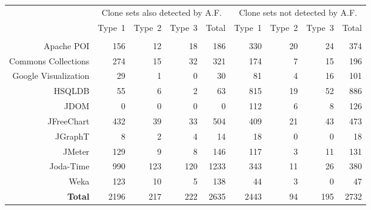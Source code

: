 
   {

\thesis{\begin{adjustwidth}{-35pt}{}}
\paper{\begin{adjustwidth}{-35pt}{}}

      \begin{tabular}{r@{\quad}
         rrrr|
         rrrr
      }

         & \multicolumn{4}{c|}{Clone sets also detected by A.F.}
         & \multicolumn{4}{c}{Clone sets not detected by A.F.}
         \\
         & Type~1 & Type~2 & Type~3 & Total
         & Type~1 & Type~2 & Type~3 & Total
         \\
         & & & &
         & & & &
         \\
                  Apache POI & 156 & 12 & 18 & 186 & 330 & 20 & 24 & 374 \\
         Commons Collections & 274 & 15 & 32 & 321 & 174 & 7 & 15 & 196 \\
         Google Visualization & 29 & 1 & 0 & 30 & 81 & 4 & 16 & 101 \\
         HSQLDB & 55 & 6 & 2 & 63 & 815 & 19 & 52 & 886 \\[0.5em]
         JDOM & 0 & 0 & 0 & 0 & 112 & 6 & 8 & 126 \\
         JFreeChart & 432 & 39 & 33 & 504 & 409 & 21 & 43 & 473 \\
         JGraphT & 8 & 2 & 4 & 14 & 18 & 0 & 0 & 18 \\
         JMeter & 129 & 9 & 8 & 146 & 117 & 3 & 11 & 131 \\[0.5em]
         Joda-Time & 990 & 123 & 120 & 1233 & 343 & 11 & 26 & 380 \\
         Weka & 123 & 10 & 5 & 138 & 44 & 3 & 0 & 47 \\[0.7em]
         {\bf Total} & 2196 & 217 & 222 & 2635 & 2443 & 94 & 195 & 2732 \\
         
      \end{tabular}

      \thesis{\end{adjustwidth}}
      \paper{\end{adjustwidth}}
      
   }
\notslides{\end{table*}}
